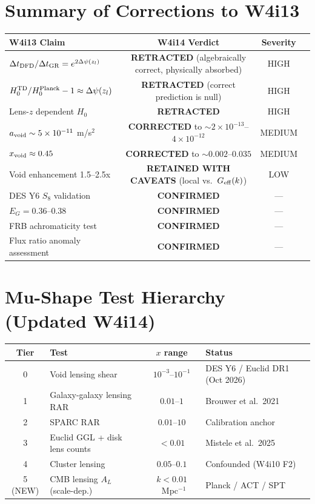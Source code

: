 \documentclass[11pt,a4paper]{article}
\newcommand{\Geff}{G_{\rm eff}}
\newcommand{\Dpsi}{\Delta\psi}
\newcommand{\ee}[1]{\times 10^{#1}}
\begin{document}
\section{Summary of Corrections to W4i13}

\begin{center}
\begin{tabular}{lccc}
\toprule
W4i13 Claim & W4i14 Verdict & Severity \\
\midrule
$\Delta t_{\rm DFD}/\Delta t_{\rm GR} = e^{2\Dpsi(z_l)}$ &
  \textbf{RETRACTED} (algebraically correct, physically absorbed) & HIGH \\
$H_0^{\rm TD}/H_0^{\rm Planck} - 1 \approx \Dpsi(z_l)$ &
  \textbf{RETRACTED} (correct prediction is null) & HIGH \\
Lens-$z$ dependent $H_0$ & \textbf{RETRACTED} & HIGH \\
$a_{\rm void} \sim 5\ee{-11}$ m/s$^2$ &
  \textbf{CORRECTED} to $\sim 2\ee{-13}$--$4\ee{-12}$ & MEDIUM \\
$x_{\rm void} \approx 0.45$ &
  \textbf{CORRECTED} to $\sim 0.002$--$0.035$ & MEDIUM \\
Void enhancement 1.5--2.5x &
  \textbf{RETAINED WITH CAVEATS} (local vs.\ $\Geff(k)$) & LOW \\
DES Y6 $S_8$ validation & \textbf{CONFIRMED} & --- \\
$E_G = 0.36$--$0.38$ & \textbf{CONFIRMED} & --- \\
FRB achromaticity test & \textbf{CONFIRMED} & --- \\
Flux ratio anomaly assessment & \textbf{CONFIRMED} & --- \\
\bottomrule
\end{tabular}
\end{center}


\section{Mu-Shape Test Hierarchy (Updated W4i14)}

\begin{center}
\begin{tabular}{clcl}
\toprule
Tier & Test & $x$ range & Status \\
\midrule
0 & Void lensing shear & $10^{-3}$--$10^{-1}$ & DES Y6 / Euclid DR1 (Oct 2026) \\
1 & Galaxy-galaxy lensing RAR & $0.01$--$1$ & Brouwer et al.\ 2021 \\
2 & SPARC RAR & $0.01$--$10$ & Calibration anchor \\
3 & Euclid GGL + disk lens counts & $< 0.01$ & Mistele et al.\ 2025 \\
4 & Cluster lensing & $0.05$--$0.1$ & Confounded (W4i10 F2) \\
5 (NEW) & CMB lensing $A_L$ (scale-dep.) & $k < 0.01$~Mpc$^{-1}$ & Planck / ACT / SPT \\
\bottomrule
\end{tabular}
\end{center}
\end{document}
